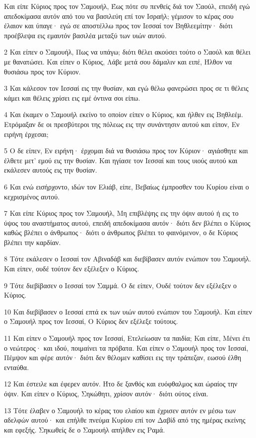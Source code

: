 \par Και είπε Κύριος προς τον Σαμουήλ, Έως πότε συ πενθείς διά τον Σαούλ, επειδή εγώ απεδοκίμασα αυτόν από του να βασιλεύη επί τον Ισραήλ; γέμισον το κέρας σου έλαιον και ύπαγε· εγώ σε αποστέλλω προς τον Ιεσσαί τον Βηθλεεμίτην· διότι προέβλεψα εις εμαυτόν βασιλέα μεταξύ των υιών αυτού.
\par 2 Και είπεν ο Σαμουήλ, Πως να υπάγω; διότι θέλει ακούσει τούτο ο Σαούλ και θέλει με θανατώσει. Και είπεν ο Κύριος, Λάβε μετά σου δάμαλιν και ειπέ, Ήλθον να θυσιάσω προς τον Κύριον.
\par 3 Και κάλεσον τον Ιεσσαί εις την θυσίαν, και εγώ θέλω φανερώσει προς σε τι θέλεις κάμει και θέλεις χρίσει εις εμέ όντινα σοι είπω.
\par 4 Και έκαμεν ο Σαμουήλ εκείνο το οποίον είπεν ο Κύριος, και ήλθεν εις Βηθλεέμ. Ετρόμαξαν δε οι πρεσβύτεροι της πόλεως εις την συνάντησιν αυτού και είπον, Εν ειρήνη έρχεσαι;
\par 5 Ο δε είπεν, Εν ειρήνη· έρχομαι διά να θυσιάσω προς τον Κύριον· αγιάσθητε και έλθετε μετ' εμού εις την θυσίαν. Και ηγίασε τον Ιεσσαί και τους υιούς αυτού και εκάλεσεν αυτούς εις την θυσίαν.
\par 6 Και ενώ εισήρχοντο, ιδών τον Ελιάβ, είπε, Βεβαίως έμπροσθεν του Κυρίου είναι ο κεχρισμένος αυτού.
\par 7 Και είπε Κύριος προς τον Σαμουήλ, Μη επιβλέψης εις την όψιν αυτού ή εις το ύψος του αναστήματος αυτού, επειδή απεδοκίμασα αυτόν· διότι δεν βλέπει ο Κύριος καθώς βλέπει ο άνθρωπος· διότι ο άνθρωπος βλέπει το φαινόμενον, ο δε Κύριος βλέπει την καρδίαν.
\par 8 Τότε εκάλεσεν ο Ιεσσαί τον Αβιναδάβ και διεβίβασεν αυτόν ενώπιον του Σαμουήλ. Και είπεν, ουδέ τούτον δεν εξέλεξεν ο Κύριος.
\par 9 Τότε διεβίβασεν ο Ιεσσαί τον Σαμμά. Ο δε είπεν, Ουδέ τούτον δεν εξέλεξεν ο Κύριος.
\par 10 Και διεβίβασεν ο Ιεσσαί επτά εκ των υιών αυτού ενώπιον του Σαμουήλ. Και είπεν ο Σαμουήλ προς τον Ιεσσαί, Ο Κύριος δεν εξέλεξε τούτους.
\par 11 Και είπεν ο Σαμουήλ προς τον Ιεσσαί, Ετελείωσαν τα παιδία; Και είπε, Μένει έτι ο νεώτερος· και ιδού, ποιμαίνει τα πρόβατα. Και είπεν ο Σαμουήλ προς τον Ιεσσαί, Πέμψον και φέρε αυτόν· διότι δεν θέλομεν καθίσει εις την τράπεζαν, εωσού έλθη ενταύθα.
\par 12 Και έστειλε και έφερεν αυτόν. Ήτο δε ξανθός και ευόφθαλμος και ώραίος την όψιν. Και είπεν ο Κύριος, Σηκώθητι, χρίσον αυτόν· διότι ούτος είναι.
\par 13 Τότε έλαβεν ο Σαμουήλ το κέρας του ελαίου και έχρισεν αυτόν εν μέσω των αδελφών αυτού· και επήλθε πνεύμα Κυρίου επί τον Δαβίδ από της ημέρας εκείνης και εφεξής. Σηκωθείς δε ο Σαμουήλ απήλθεν εις Ραμά.
